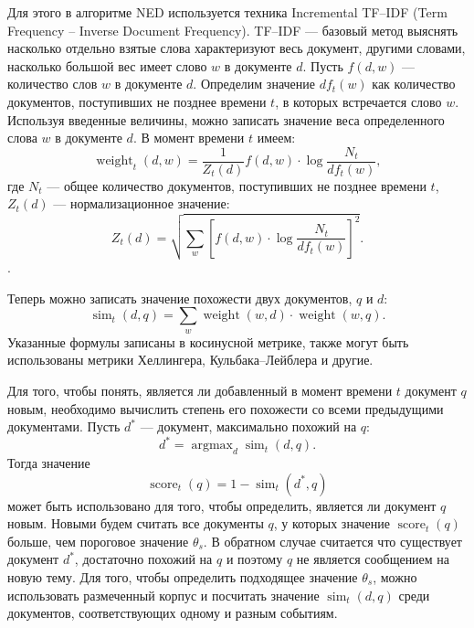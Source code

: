\documentclass[14pt,a4paper,oneside]{extarticle}
\DeclareMathOperator*{\argmax}{argmax}
\DeclareMathOperator{\weight}{weight}
\DeclareMathOperator{\score}{score}
\DeclareMathOperator{\simu}{sim}
\begin{document}
	Для этого в алгоритме NED используется техника Incremental TF--IDF (Term Frequency -- Inverse Document Frequency). TF--IDF --- базовый метод выяснять насколько отдельно взятые слова характеризуют весь документ, другими словами, насколько большой вес имеет слово $w$ в документе $d$. Пусть $f(d,w)$ --- количество слов $w$ в документе $d$. Определим значение $df_t(w)$ как количество документов, поступивших не позднее времени $t$, в которых встречается слово $w$. Используя введенные величины, можно записать значение веса определенного слова $w$ в документе $d$. В момент времени $t$ имеем:
	\begin{equation}
	\weight_t(d,w) = \frac{1}{Z_t(d)}f(d,w) \cdot \log \frac{N_t}{df_t(w)},
	\end{equation}
	где $N_t$ --- общее количество документов, поступивших не позднее времени $t$, $Z_t(d)$ --- нормализационное значение:
	\begin{equation}
	Z_t(d) = \sqrt{\sum_w \left[ f(d,w) \cdot \log \frac{N_t}{df_t(w)} \right]^2}.
	\end{equation}.
	
	Теперь можно записать значение похожести двух документов, $q$ и $d$:
	\begin{equation}
	\simu_t(d,q) = \sum_w \weight(w, d) \cdot \weight(w, q).
	\end{equation}
	Указанные формулы записаны в косинусной метрике, также могут быть использованы метрики Хеллингера, Кульбака--Лейблера и другие.
	
	Для того, чтобы понять, является ли добавленный в момент времени $t$ документ $q$ новым, необходимо вычислить степень его похожести со всеми предыдущими документами. Пусть $d^*$ --- документ, максимально похожий на $q$:
	\begin{equation}
	d^* = \argmax_d \simu_t (d,q).
	\end{equation}
	Тогда значение
	\begin{equation}
	\score_t(q) = 1 - \simu_t (d^*, q)
	\end{equation}
	может быть использовано для того, чтобы определить, является ли документ $q$ новым. Новыми будем считать все документы $q$, у которых значение $\score_t(q)$ больше, чем пороговое значение $\theta_s$. В обратном случае считается что существует документ $d^*$, достаточно похожий на $q$ и поэтому $q$ не является сообщением на новую тему. Для того, чтобы определить подходящее значение $\theta_s$, можно использовать размеченный корпус и посчитать значение $\simu_t (d,q)$ среди документов, соответствующих одному и разным событиям.
	
\end{document}
